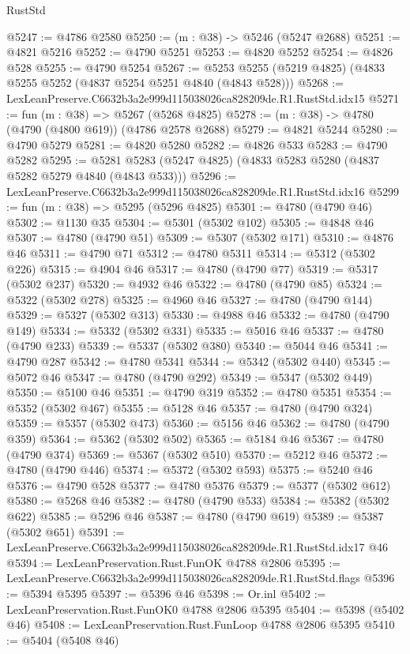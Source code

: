 \begin{lexlean}{RustStd}
\begin{coremodule}
@5247 := @4786 @2580
@5250 := (m : @38) -> @5246 (@5247 @2688)
@5251 := @4821 @5216
@5252 := @4790 @5251
@5253 := @4820 @5252
@5254 := @4826 @528
@5255 := @4790 @5254
@5267 := @5253 @5255 (@5219 @4825) (@4833 @5255 @5252 (@4837 @5254 @5251 @4840 (@4843 @528)))
@5268 := LexLeanPreserve.C6632b3a2e999d115038026ca828209de.R1.RustStd.idx15
@5271 := fun (m : @38) => @5267 (@5268 @4825)
@5278 := (m : @38) -> @4780 (@4790 (@4800 @619)) (@4786 @2578 @2688)
@5279 := @4821 @5244
@5280 := @4790 @5279
@5281 := @4820 @5280
@5282 := @4826 @533
@5283 := @4790 @5282
@5295 := @5281 @5283 (@5247 @4825) (@4833 @5283 @5280 (@4837 @5282 @5279 @4840 (@4843 @533)))
@5296 := LexLeanPreserve.C6632b3a2e999d115038026ca828209de.R1.RustStd.idx16
@5299 := fun (m : @38) => @5295 (@5296 @4825)
@5301 := @4780 (@4790 @46)
@5302 := @1130 @35
@5304 := @5301 (@5302 @102)
@5305 := @4848 @46
@5307 := @4780 (@4790 @51)
@5309 := @5307 (@5302 @171)
@5310 := @4876 @46
@5311 := @4790 @71
@5312 := @4780 @5311
@5314 := @5312 (@5302 @226)
@5315 := @4904 @46
@5317 := @4780 (@4790 @77)
@5319 := @5317 (@5302 @237)
@5320 := @4932 @46
@5322 := @4780 (@4790 @85)
@5324 := @5322 (@5302 @278)
@5325 := @4960 @46
@5327 := @4780 (@4790 @144)
@5329 := @5327 (@5302 @313)
@5330 := @4988 @46
@5332 := @4780 (@4790 @149)
@5334 := @5332 (@5302 @331)
@5335 := @5016 @46
@5337 := @4780 (@4790 @233)
@5339 := @5337 (@5302 @380)
@5340 := @5044 @46
@5341 := @4790 @287
@5342 := @4780 @5341
@5344 := @5342 (@5302 @440)
@5345 := @5072 @46
@5347 := @4780 (@4790 @292)
@5349 := @5347 (@5302 @449)
@5350 := @5100 @46
@5351 := @4790 @319
@5352 := @4780 @5351
@5354 := @5352 (@5302 @467)
@5355 := @5128 @46
@5357 := @4780 (@4790 @324)
@5359 := @5357 (@5302 @473)
@5360 := @5156 @46
@5362 := @4780 (@4790 @359)
@5364 := @5362 (@5302 @502)
@5365 := @5184 @46
@5367 := @4780 (@4790 @374)
@5369 := @5367 (@5302 @510)
@5370 := @5212 @46
@5372 := @4780 (@4790 @446)
@5374 := @5372 (@5302 @593)
@5375 := @5240 @46
@5376 := @4790 @528
@5377 := @4780 @5376
@5379 := @5377 (@5302 @612)
@5380 := @5268 @46
@5382 := @4780 (@4790 @533)
@5384 := @5382 (@5302 @622)
@5385 := @5296 @46
@5387 := @4780 (@4790 @619)
@5389 := @5387 (@5302 @651)
@5391 := LexLeanPreserve.C6632b3a2e999d115038026ca828209de.R1.RustStd.idx17 @46
@5394 := LexLeanPreservation.Rust.FunOK @4788 @2806
@5395 := LexLeanPreserve.C6632b3a2e999d115038026ca828209de.R1.RustStd.flags
@5396 := @5394 @5395
@5397 := @5396 @46
@5398 := Or.inl
@5402 := LexLeanPreservation.Rust.FunOK0 @4788 @2806 @5395
@5404 := @5398 (@5402 @46)
@5408 := LexLeanPreservation.Rust.FunLoop @4788 @2806 @5395
@5410 := @5404 (@5408 @46)

\end{coremodule}
\end{lexlean}
